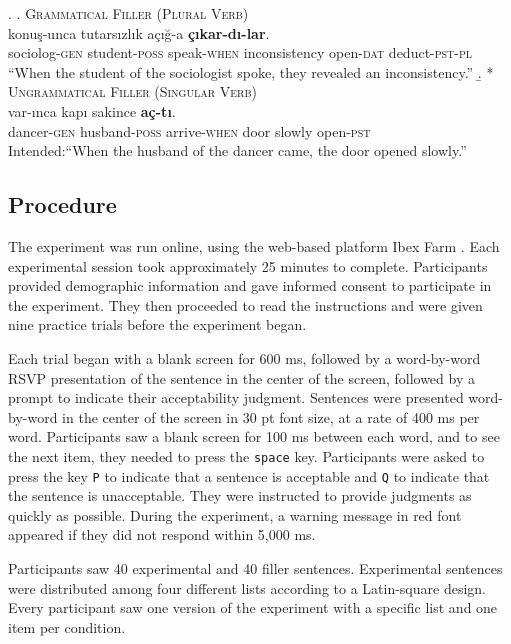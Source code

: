 \documentclass[]{interact}
\theoremstyle{plain}%
\theoremstyle{definition}
\theoremstyle{remark}
\begin{document}
\ex. \label{ex:fillers}
  \a. \textsc{Grammatical Filler (Plural Verb)} \label{ex:gram_filler}\\
   konu\c{s}-unca tutars{\i}zl{\i}k a\c{c}{\i}\u{g}-a \textbf{\c{c}{\i}kar-d{\i}-lar}.\\ 
  sociolog-\textsc{gen}  student-\textsc{poss} speak-\textsc{when} inconsistency  open-\textsc{dat} deduct-\textsc{pst}-\textsc{pl}\\
  \glt ``When the student of the sociologist spoke, they revealed an inconsistency.''
  \b. * \textsc{Ungrammatical Filler (Singular Verb)} \label{ex:ung_filler}\\
   var-{\i}nca kap{\i} sakince \textbf{a\c{c}-t{\i}}. \\
  dancer-\textsc{gen}  husband-\textsc{poss} arrive-\textsc{when} door slowly  open-\textsc{pst}\\
  \glt Intended:``When the husband of the dancer came, the door opened slowly.''


\subsection{Procedure}

The experiment was run online, using the web-based platform Ibex Farm \citep{Drummond2013}. Each experimental session took approximately 25 minutes to complete. Participants provided demographic information and gave informed consent to participate in the experiment. They then proceeded to read the instructions and were given nine practice trials before the experiment began.

Each trial began with a blank screen for 600 ms, followed by a word-by-word RSVP presentation of the sentence in the center of the screen, followed by a prompt to indicate their acceptability judgment. Sentences were presented word-by-word in the center of the screen in 30 pt font size, at a rate of 400 ms per word. Participants saw a blank screen for 100 ms between each word, and to see the next item, they needed to press the \texttt{space} key. Participants were asked to press the key \texttt{P} to indicate that a sentence is acceptable and \texttt{Q} to indicate that the sentence is unacceptable. They were instructed to provide judgments as quickly as possible. During the experiment, a warning message in red font appeared if they did not respond within 5,000 ms.

Participants saw 40 experimental and 40 filler sentences. Experimental sentences were distributed among four different lists according to a Latin-square design. Every participant saw one version of the experiment with a specific list and one item per condition.
\end{document}
